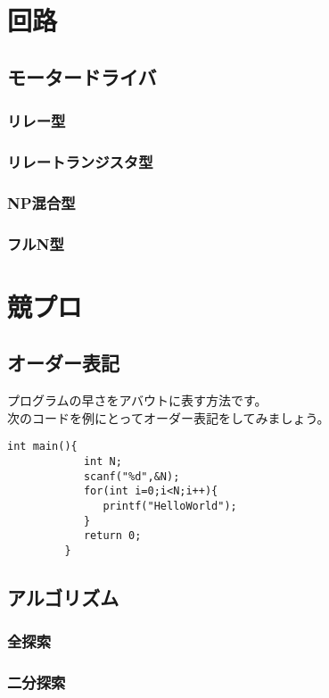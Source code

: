 \documentclass{jarticle}
\begin{document}
\clearpage

\section{回路}
   \subsection{モータードライバ}
      \subsubsection{リレー型}
      \subsubsection{リレートランジスタ型}
      \subsubsection{NP混合型}
      \subsubsection{フルN型}
\clearpage

\section{競プロ}
   \subsection{オーダー表記}
      プログラムの早さをアバウトに表す方法です。
      \\次のコードを例にとってオーダー表記をしてみましょう。
      \begin{lstlisting}[basicstyle=\ttfamily,frame=single]
         int main(){
            int N;
            scanf("%d",&N);
            for(int i=0;i<N;i++){
               printf("HelloWorld");
            }
            return 0;
         }
      \end{lstlisting}
   \subsection{アルゴリズム}
      \subsubsection{全探索}
      \subsubsection{二分探索}
\end{document}
